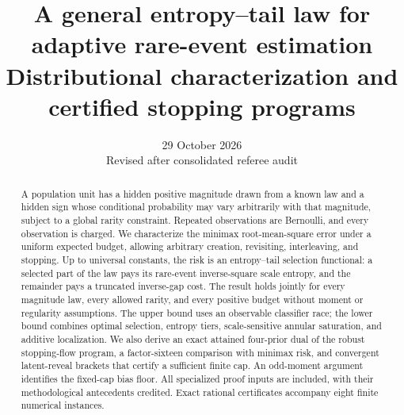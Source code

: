 \documentclass[11pt,a4paper]{article}
\title{\textbf{A general entropy--tail law for\protect\\adaptive rare-event estimation}\protect\\[0.4em]
\large Distributional characterization and certified stopping programs}
\author{}
\date{29 October 2026\protect\\Revised after consolidated referee audit}
\theoremstyle{definition}
\theoremstyle{remark}
\newcommand{\1}{\mathbf 1}
\begin{document}
\maketitle
\thispagestyle{empty}
\begin{abstract}
A population unit has a hidden positive magnitude drawn from a known law
and a hidden sign whose conditional probability may vary arbitrarily with
that magnitude, subject to a global rarity constraint. Repeated observations
are Bernoulli, and every observation is charged. We characterize the minimax
root-mean-square error under a uniform expected budget, allowing arbitrary
creation, revisiting, interleaving, and stopping. Up to universal constants,
the risk is an entropy--tail selection functional: a selected part of the
law pays its rare-event inverse-square scale entropy, and the remainder
pays a truncated inverse-gap cost. The result holds jointly for every
magnitude law, every allowed rarity, and every positive budget without
moment or regularity assumptions. The upper bound uses an observable
classifier race; the lower bound combines optimal selection, entropy
tiers, scale-sensitive annular saturation, and additive localization.
We also derive an exact attained four-prior dual of the robust stopping-flow
program, a factor-sixteen comparison with minimax risk, and convergent
latent-reveal brackets that certify a sufficient finite cap. An odd-moment
argument identifies the fixed-cap bias floor. All specialized proof inputs
are included, with their methodological antecedents credited. Exact rational
certificates accompany eight finite numerical instances.
\end{abstract}
\medskip
{}
\newpage
\begingroup\small\setlength{\parskip}{0pt}\tableofcontents\endgroup
\newpage





\clearpage
\appendix

\end{document}

